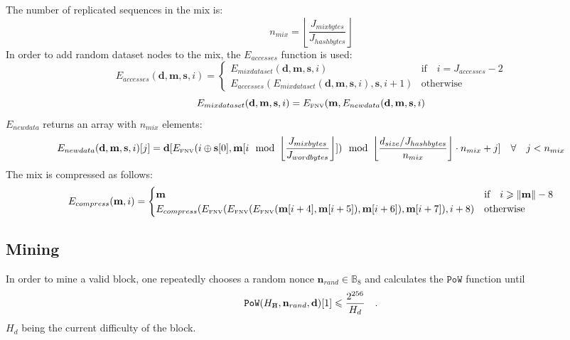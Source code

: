 \documentclass[9pt,oneside]{amsart}
\newcommand{\hcancel}[1]{%
    \tikz[baseline=(tocancel.base)]{
        \node[inner sep=0pt,outer sep=0pt] (tocancel) {#1};
        \draw[black] (tocancel.south west) -- (tocancel.north east);
    }%
}%
\begin{document}
The number of replicated sequences in the mix is:
\begin{equation}
 n_{mix} =  \left\lfloor\frac{J_{mixbytes}}{J_{hashbytes}}\right\rfloor
\end{equation}
In order to add random dataset nodes to the mix, the $E_{accesses}$ function is used:
\begin{equation}
 E_{accesses}(\mathbf{d}, \mathbf{m}, \mathbf{s}, i) = \begin{cases}
E_{mixdataset}(\mathbf{d}, \mathbf{m},  \mathbf{s}, i) & \text{if} \quad i = J_{accesses} -2 \\
E_{accesses}(E_{mixdataset}(\mathbf{d}, \mathbf{m}, \mathbf{s}, i), \mathbf{s}, i + 1) & \text{otherwise}
\end{cases}
\end{equation}
\begin{equation}
 E_{mixdataset}(\mathbf{d}, \mathbf{m}, \mathbf{s}, i) = E_\text{\tiny FNV}(\mathbf{m}, E_{newdata}(\mathbf{d}, \mathbf{m}, \mathbf{s}, i)
\end{equation}
$E_{newdata}$ returns an array with $n_{mix}$ elements:
\begin{equation}
 E_{newdata}(\mathbf{d}, \mathbf{m}, \mathbf{s}, i)[j] = \mathbf{d}[E_\text{\tiny FNV}(i \oplus \mathbf{s}[0], \mathbf{m}[i \mod \left\lfloor\frac{J_{mixbytes}}{J_{wordbytes}}\right\rfloor]) \mod \left\lfloor\frac{d_{size} / J_{hashbytes}}{n_{mix}}\right\rfloor \cdot n_{mix} + j] \quad \forall \quad j < n_{mix}
\end{equation}
The mix is compressed as follows:
\begin{equation}
 E_{compress}(\mathbf{m}, i) = \begin{cases}
\mathbf{m} & \text{if} \quad i \geqslant \lVert \mathbf{m} \rVert - 8 \\
E_{compress}(E_\text{\tiny FNV}(E_\text{\tiny FNV}(E_\text{\tiny FNV}(\mathbf{m}[i + 4], \mathbf{m}[i + 5]), \mathbf{m}[i + 6]), \mathbf{m}[i + 7]), i + 8) & \text{otherwise}
\end{cases}
\end{equation}

\subsection{Mining}
In order to mine a valid block, one repeatedly chooses a random nonce $\mathbf{n}_{rand} \in \mathbb{B}_{8}$ and calculates the $\mathtt{PoW}$ function until
\begin{equation}
 \mathtt{PoW}(H_{\hcancel{n}}, \mathbf{n}_{rand}, \mathbf{d})[1] \leqslant \frac{2^{256}}{H_d}\quad.
\end{equation}
$H_d$ being the current difficulty of the block.
\end{document}
